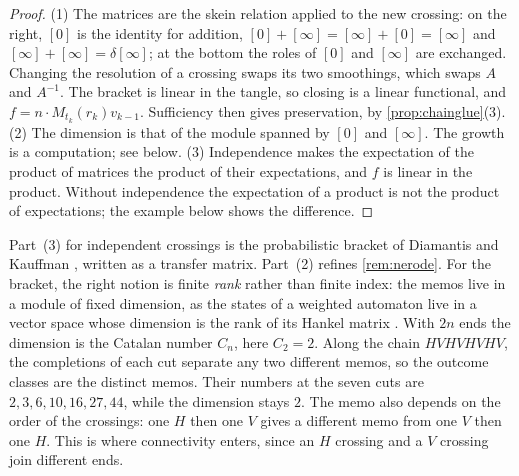 \documentclass[11pt]{article}
\theoremstyle{definition}\newtheorem{definition}[theorem]{Definition}\newtheorem{remark}[theorem]{Remark}\newtheorem{example}[theorem]{Example}\newtheorem{problem}[theorem]{Open problem}\crefname{problem}{Problem}{Problems}
\begin{document}
\begin{proof}
(1) The matrices are the skein relation applied to the new crossing: on the right, $[0]$ is the identity for addition, $[0]+[\infty]=[\infty]+[0]=[\infty]$ and $[\infty]+[\infty]=\delta[\infty]$; at the bottom the roles of $[0]$ and $[\infty]$ are exchanged. Changing the resolution of a crossing swaps its two smoothings, which swaps $A$ and $A^{-1}$. The bracket is linear in the tangle, so closing is a linear functional, and $f=n\cdot M_{t_k}(r_k)v_{k-1}$. Sufficiency then gives preservation, by \cref{prop:chainglue}(3).
(2) The dimension is that of the module spanned by $[0]$ and $[\infty]$. The growth is a computation; see below.
(3) Independence makes the expectation of the product of matrices the product of their expectations, and $f$ is linear in the product. Without independence the expectation of a product is not the product of expectations; the example below shows the difference.
\end{proof}

Part~(3) for independent crossings is the probabilistic bracket of Diamantis and Kauffman \cite{DiamantisKauffman2026}, written as a transfer matrix. Part~(2) refines \cref{rem:nerode}. For the bracket, the right notion is finite \emph{rank} rather than finite index: the memos live in a module of fixed dimension, as the states of a weighted automaton live in a vector space whose dimension is the rank of its Hankel matrix \cite{Fliess1974}. With $2n$ ends the dimension is the Catalan number $C_n$, here $C_2=2$. Along the chain $HVHVHVHV$, the completions of each cut separate any two different memos, so the outcome classes are the distinct memos. Their numbers at the seven cuts are $2,3,6,10,16,27,44$, while the dimension stays $2$. The memo also depends on the order of the crossings: one $H$ then one $V$ gives a different memo from one $V$ then one $H$. This is where connectivity enters, since an $H$ crossing and a $V$ crossing join different ends.
\end{document}
